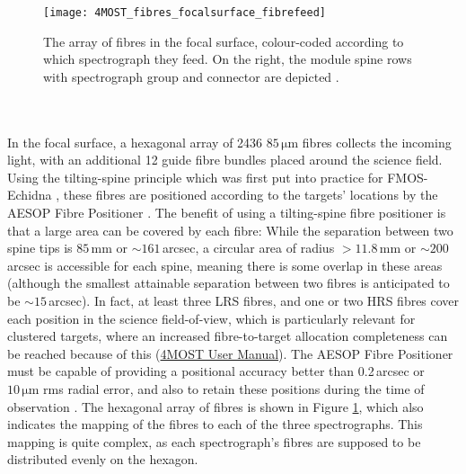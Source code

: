 \documentclass[a4paper,11pt]{article}
\begin{document}
%
\begin{figure}
 \centering
 \texttt{[image: 4MOST\_fibres\_focalsurface\_fibrefeed]}
 \caption[Hexagonal array of fibres in focal surface]{The array of fibres in the focal surface, colour-coded according to which spectrograph they feed. On the right, the module spine rows with spectrograph group and connector are depicted \citep{haynes16}.}
 \label{fig:fibres_focal}
\end{figure}\\ \\
%
In the focal surface, a hexagonal array of 2436 $85\,\mathrm{\mu m}$ fibres collects the incoming light, with an additional 12 guide fibre bundles placed around the science field. Using the tilting-spine principle which was first put into practice for FMOS-Echidna \citep{sheinis14,akiyama08}, these fibres are positioned according to the targets' locations by the AESOP Fibre Positioner \citep{brzeski18}. The benefit of using a tilting-spine fibre positioner is that a large area can be covered by each fibre: While the separation between two spine tips is $85\,\mathrm{mm}$ or ${\sim}161$\,arcsec, a circular area of radius $>11.8\,\mathrm{mm}$ or ${\sim}200$\,arcsec is accessible for each spine, meaning there is some overlap in these areas (although the smallest attainable separation between two fibres is anticipated to be ${\sim}15$\,arcsec). In fact, at least three LRS fibres, and one or two HRS fibres cover each position in the science field-of-view, which is particularly relevant for clustered targets, where an increased fibre-to-target allocation completeness can be reached because of this (\href{https://www.4most.eu/cms/files/VIS-MAN-4MOST-47110-9800-0001_2_00-4MOST-User-Manual.pdf}{4MOST User Manual}). The AESOP Fibre Positioner must be capable of providing a positional accuracy better than 0.2\,arcsec or $10\,\mathrm{\mu m}$ rms radial error, and also to retain these positions during the time of observation \citep{4most16}. The hexagonal array of fibres is shown in Figure \ref{fig:fibres_focal}, which also indicates the mapping of the fibres to each of the three spectrographs. This mapping is quite complex, as each spectrograph's fibres are supposed to be distributed evenly on the hexagon.\\ \\
%
\end{document}
